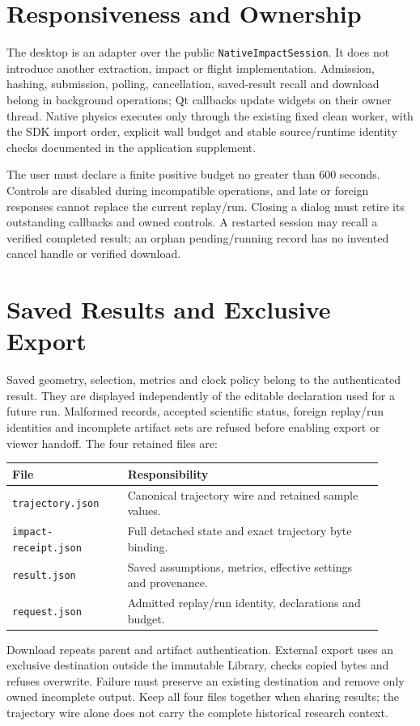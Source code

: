\documentclass[11pt]{article}
\newcommand{\code}[1]{\nolinkurl{#1}}
\begin{document}
\newpage
\section*{Responsiveness and Ownership}
The desktop is an adapter over the public \code{NativeImpactSession}. It does
not introduce another extraction, impact or flight implementation. Admission,
hashing, submission, polling, cancellation, saved-result recall and download
belong in background operations; Qt callbacks update widgets on their owner
thread. Native physics executes only through the existing fixed clean worker,
with the SDK import order, explicit wall budget and stable source/runtime
identity checks documented in the application supplement.

The user must declare a finite positive budget no greater than 600 seconds.
Controls are disabled during incompatible operations, and late or foreign
responses cannot replace the current replay/run. Closing a dialog must retire
its outstanding callbacks and owned controls. A restarted session may recall a
verified completed result; an orphan pending/running record has no invented
cancel handle or verified download.

\section*{Saved Results and Exclusive Export}
Saved geometry, selection, metrics and clock policy belong to the authenticated
result. They are displayed independently of the editable declaration used for a
future run. Malformed records, accepted scientific status, foreign replay/run
identities and incomplete artifact sets are refused before enabling export or
viewer handoff. The four retained files are:
\begin{center}\small
\begin{tabular}{>{\raggedright\arraybackslash}p{0.29\linewidth}>{\raggedright\arraybackslash}p{0.62\linewidth}}\toprule
File & Responsibility\\\midrule
\code{trajectory.json} & Canonical trajectory wire and retained sample values.\\
\code{impact-receipt.json} & Full detached state and exact trajectory byte binding.\\
\code{result.json} & Saved assumptions, metrics, effective settings and provenance.\\
\code{request.json} & Admitted replay/run identity, declarations and budget.\\\bottomrule
\end{tabular}
\end{center}
Download repeats parent and artifact authentication. External export uses an
exclusive destination outside the immutable Library, checks copied bytes and
refuses overwrite. Failure must preserve an existing destination and remove only
owned incomplete output. Keep all four files together when sharing results;
the trajectory wire alone does not carry the complete historical research context.
\end{document}
